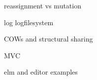 \documentclass[conference]{IEEEtran}
\begin{document}
reassignment vs mutation

log logfilesystem

COWs and structural sharing

MVC

elm and editor examples



\end{document}
